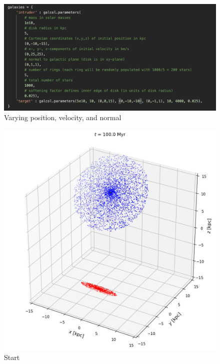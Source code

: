 \documentclass[linenumbers,RNAAS,trackchanges]{aastex631}
\begin{document}
\begin{figure}[H]
    \centering
    \includegraphics[scale=.60]{comparison_galaxy/ARP_50_vars.png}
    \caption{Varying position, velocity, and normal}
    \label{fig:code}
\end{figure}
\newpage
\begin{figure}[H]
    \centering
    \includegraphics[scale=.40]{comparison_galaxy/ARP_50_input.png}
    \caption{Start}
    \label{fig:code}
\end{figure}
\end{document}
